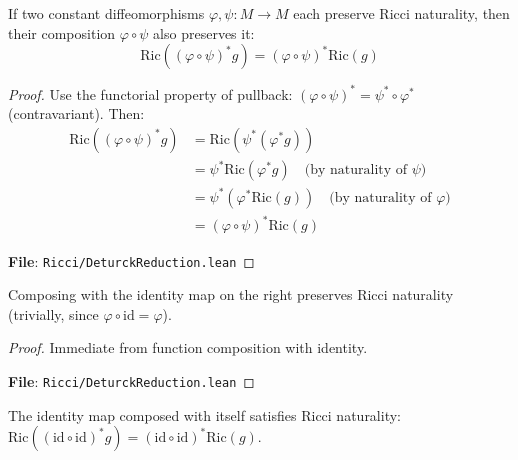 \begin{lemma}
\label{lem:ricciNaturalityOn_const_comp}
\leanok
{}
If two constant diffeomorphisms $\varphi, \psi : M \to M$ each preserve Ricci naturality, then their composition $\varphi \circ \psi$ also preserves it:
\[ \mathrm{Ric}((\varphi \circ \psi)^* g) = (\varphi \circ \psi)^* \mathrm{Ric}(g) \]
\end{lemma}

\begin{proof}
\leanok
{}
Use the functorial property of pullback: $(\varphi \circ \psi)^* = \psi^* \circ \varphi^*$ (contravariant).
Then:
\begin{align*}
\mathrm{Ric}((\varphi \circ \psi)^* g) &= \mathrm{Ric}(\psi^* (\varphi^* g)) \\
&= \psi^* \mathrm{Ric}(\varphi^* g) \quad \text{(by naturality of $\psi$)} \\
&= \psi^* (\varphi^* \mathrm{Ric}(g)) \quad \text{(by naturality of $\varphi$)} \\
&= (\varphi \circ \psi)^* \mathrm{Ric}(g)
\end{align*}

\textbf{File}: \texttt{Ricci/DeturckReduction.lean}
\end{proof}

\begin{lemma}
\label{lem:ricciNaturalityOn_comp_id}
\leanok
{}
Composing with the identity map on the right preserves Ricci naturality (trivially, since $\varphi \circ \mathrm{id} = \varphi$).
\end{lemma}

\begin{proof}
\leanok
{}
Immediate from function composition with identity.

\textbf{File}: \texttt{Ricci/DeturckReduction.lean}
\end{proof}

\begin{lemma}
\label{lem:ricciNaturalityOn_id_id}
\leanok
{}
The identity map composed with itself satisfies Ricci naturality: $\mathrm{Ric}((\mathrm{id} \circ \mathrm{id})^* g) = (\mathrm{id} \circ \mathrm{id})^* \mathrm{Ric}(g)$.
\end{lemma}

